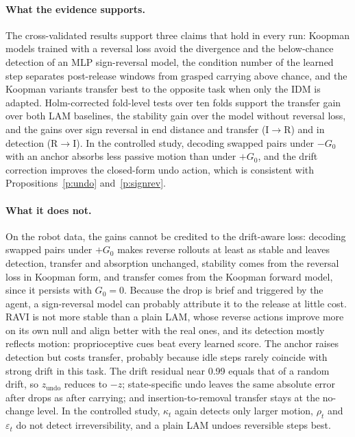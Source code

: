 \documentclass{jcse}
\newcommand{\method}{RAVI}
\newcommand{\zundo}{z_{\mathrm{undo}}}
\begin{document}
\paragraph{What the evidence supports.}
The cross-validated results support three claims that hold in every run: Koopman models trained with a reversal loss avoid the divergence and the below-chance detection of an MLP sign-reversal model, the condition number of the learned step separates post-release windows from grasped carrying above chance, and the Koopman variants transfer best to the opposite task when only the IDM is adapted. Holm-corrected fold-level tests over ten folds support the transfer gain over both LAM baselines, the stability gain over the model without reversal loss, and the gains over sign reversal in end distance and transfer (I$\to$R) and in detection (R$\to$I).
In the controlled study, decoding swapped pairs under $-G_0$ with an anchor absorbs less passive motion than under $+G_0$, and the drift correction improves the closed-form undo action, which is consistent with Propositions~\ref{p:undo} and~\ref{p:signrev}.

\paragraph{What it does not.}
On the robot data, the gains cannot be credited to the drift-aware loss: decoding swapped pairs under $+G_0$ makes reverse rollouts at least as stable and leaves detection, transfer and absorption unchanged, stability comes from the reversal loss in Koopman form, and transfer comes from the Koopman forward model, since it persists with $G_0=0$.
Because the drop is brief and triggered by the agent, a sign-reversal model can probably attribute it to the release at little cost.
{\method} is not more stable than a plain LAM, whose reverse actions improve more on its own null and align better with the real ones, and its detection mostly reflects motion: proprioceptive cues beat every learned score. The anchor raises detection but costs transfer, probably because idle steps rarely coincide with strong drift in this task.
The drift residual near 0.99 equals that of a random drift, so $\zundo$ reduces to $-z$; state-specific undo leaves the same absolute error after drops as after carrying; and insertion-to-removal transfer stays at the no-change level.
In the controlled study, $\kappa_t$ again detects only larger motion, $\rho_t$ and $\varepsilon_t$ do not detect irreversibility, and a plain LAM undoes reversible steps best.
\end{document}
